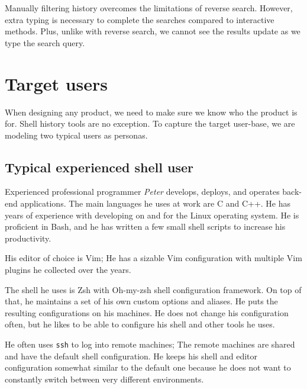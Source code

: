 Manually filtering history overcomes the limitations of reverse search. However, extra typing is necessary to complete the searches compared to interactive methods. Plus, unlike with reverse search, we cannot see the results update as we type the search query.


\section{Target users}

When designing any product, we need to make sure we know who the product is for. Shell history tools are no exception. To capture the target user-base, we are modeling two typical users as personas.


\subsection{Typical experienced shell user}

Experienced professional programmer \textit{Peter} develops, deploys, and operates back-end applications. The main languages he uses at work are C and C++. He has years of experience with developing on and for the Linux operating system. He is proficient in Bash, and he has written a few small shell scripts to increase his productivity.

His editor of choice is Vim; He has a sizable Vim configuration with multiple Vim plugins he collected over the years.

The shell he uses is Zsh with Oh-my-zsh \cite{toolsohmyzsh} shell configuration framework. On top of that, he maintains a set of his own custom options and aliases. He puts the resulting configurations on his machines. He does not change his configuration often, but he likes to be able to configure his shell and other tools he uses.

He often uses \verb|ssh| to log into remote machines; The remote machines are shared and have the default shell configuration. He keeps his shell and editor configuration somewhat similar to the default one because he does not want to constantly switch between very different environments. 

